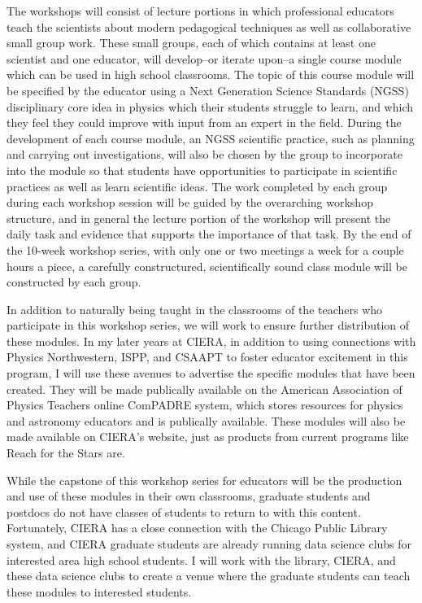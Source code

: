 \documentclass[11pt, preprint]{aastex}
\begin{document}
The workshops will consist of lecture portions in which professional educators teach the scientists about modern pedagogical techniques as well as collaborative small group work.
These small groups, each of which contains at least one scientist and one educator, will develop--or iterate upon--a single course module which can be used in high school classrooms.
The topic of this course module will be specified by the educator using a Next Generation Science Standards (NGSS) disciplinary core idea in physics which their students struggle to learn, and which they feel they could improve with input from an expert in the field.
During the development of each course module, an NGSS scientific practice, such as planning and carrying out investigations, will also be chosen by the group to incorporate into the module so that students have opportunities to participate in scientific practices as well as learn scientific ideas.
The work completed by each group during each workshop session will be guided by the overarching workshop structure, and in general the lecture portion of the workshop will present the daily task and evidence that supports the importance of that task.
By the end of the 10-week workshop series, with only one or two meetings a week for a couple hours a piece, a carefully constructured, scientifically sound class module will be constructed by each group.

In addition to naturally being taught in the classrooms of the teachers who participate in this workshop series, we will work to ensure further distribution of these modules.
In my later years at CIERA, in addition to using connections with Physics Northwestern, ISPP, and CSAAPT to foster educator excitement in this program, I will use these avenues to advertise the specific modules that have been created.
They will be made publically available on the American Association of Physics Teachers online ComPADRE system, which stores resources for physics and astronomy educators and is publically available.
These modules will also be made available on CIERA's website, just as products from current programs like Reach for the Stars are.

While the capstone of this workshop series for educators will be the production and use of these modules in their own classrooms, graduate students and postdocs do not have classes of students to return to with this content.
Fortunately, CIERA has a close connection with the Chicago Public Library system, and CIERA graduate students are already running data science clubs for interested area high school students.
I will work with the library, CIERA, and these data science clubs to create a venue where the graduate students can teach these modules to interested students.
\end{document}
